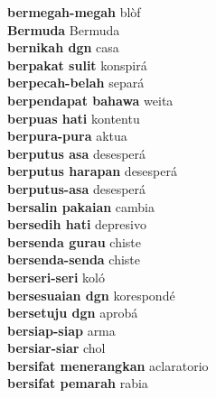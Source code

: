 \textbf{ bermegah-megah  } blòf \\
\textbf{ Bermuda  } Bermuda \\
\textbf{ bernikah dgn  } casa \\
\textbf{ berpakat sulit  } konspirá \\
\textbf{ berpecah-belah  } separá \\
\textbf{ berpendapat bahawa  } weita \\
\textbf{ berpuas hati  } kontentu \\
\textbf{ berpura-pura  } aktua \\
\textbf{ berputus asa  } desesperá \\
\textbf{ berputus harapan  } desesperá \\
\textbf{ berputus-asa  } desesperá \\
\textbf{ bersalin pakaian  } cambia \\
\textbf{ bersedih hati  } depresivo \\
\textbf{ bersenda gurau  } chiste \\
\textbf{ bersenda-senda  } chiste \\
\textbf{ berseri-seri  } koló \\
\textbf{ bersesuaian dgn  } korespondé \\
\textbf{ bersetuju dgn  } aprobá \\
\textbf{ bersiap-siap  } arma \\
\textbf{ bersiar-siar  } chol \\
\textbf{ bersifat menerangkan  } aclaratorio \\
\textbf{ bersifat pemarah  } rabia \\
